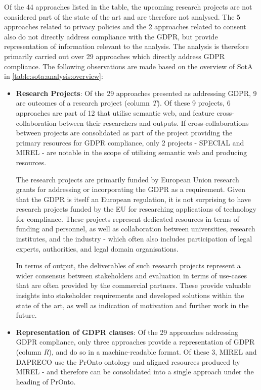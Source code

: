 Of the 44 approaches listed in the table, the upcoming research projects are not considered part of the state of the art and are therefore not analysed. The 5 approaches related to privacy policies and the 2 approaches related to consent also do not directly address compliance with the GDPR, but provide representation of information relevant to the analysis. The analysis is therefore primarily carried out over 29 approaches which directly address GDPR compliance.
The following observations are made based on the overview of SotA in \autoref{table:sota:analysis:overview}:
\begin{itemize}
    \item \textbf{Research Projects}: Of the 29 approaches presented as addressing GDPR, 9 are outcomes of a research project (column \textit{T}). Of these 9 projects, 6 approaches are part of 12 that utilise semantic web, and feature cross-collaboration between their researchers and outputs. If cross-collaborations between projects are consolidated as part of the project providing the primary resources for GDPR compliance, only 2 projects - SPECIAL and MIREL - are notable in the scope of utilising semantic web and producing resources. 
    
    The research projects are primarily funded by European Union research grants for addressing or incorporating the GDPR as a requirement. Given that the GDPR is itself an European regulation, it is not surprising to have research projects funded by the EU for researching applications of technology for compliance. These projects represent dedicated resources in terms of funding and personnel, as well as collaboration between universities, research institutes, and the industry - which often also includes participation of legal experts, authorities, and legal domain organisations.

    In terms of output, the deliverables of such research projects represent a wider consensus between stakeholders and evaluation in terms of use-cases that are often provided by the commercial partners.
    These provide valuable insights into stakeholder requirements and developed solutions within the state of the art, as well as indication of motivation and further work in the future.

    \item \textbf{Representation of GDPR clauses}: Of the 29 approaches addressing GDPR compliance, only three approaches provide a representation of GDPR (column \textit{R}), and do so in a machine-readable format.
    Of these 3, MIREL and DAPRECO use the PrOnto ontology and aligned resources produced by MIREL - and therefore can be consolidated into a single approach under the heading of PrOnto.
    

\end{itemize}
